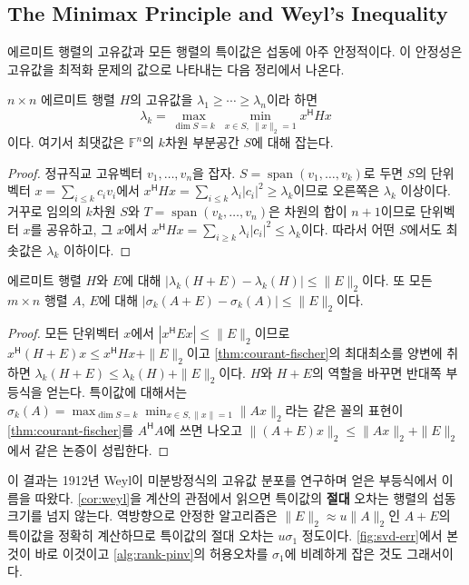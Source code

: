 \subsection{The Minimax Principle and Weyl's Inequality}

에르미트 행렬의 고유값과 모든 행렬의 특이값은 섭동에 아주 안정적이다. 이 안정성은 고유값을 최적화 문제의 값으로 나타내는 다음 정리에서 나온다.

\begin{theorem}
\label{thm:courant-fischer}
$n\times n$ 에르미트 행렬 $H$의 고유값을 $\lambda_1\ge\cdots\ge\lambda_n$이라 하면
\[
\lambda_k=\max_{\dim S=k}\ \min_{x\in S,\ \|x\|_2=1}x^{\mathsf H}Hx
\]
이다. 여기서 최댓값은 $\mathbb{F}^n$의 $k$차원 부분공간 $S$에 대해 잡는다.
\end{theorem}

\begin{proof}
정규직교 고유벡터 $v_1,\dots,v_n$을 잡자. $S=\operatorname{span}(v_1,\dots,v_k)$로 두면 $S$의 단위벡터 $x=\sum_{i\le k}c_iv_i$에서 $x^{\mathsf H}Hx=\sum_{i\le k}\lambda_i|c_i|^2\ge\lambda_k$이므로 오른쪽은 $\lambda_k$ 이상이다. 거꾸로 임의의 $k$차원 $S$와 $T=\operatorname{span}(v_k,\dots,v_n)$은 차원의 합이 $n+1$이므로 단위벡터 $x$를 공유하고, 그 $x$에서 $x^{\mathsf H}Hx=\sum_{i\ge k}\lambda_i|c_i|^2\le\lambda_k$이다. 따라서 어떤 $S$에서도 최솟값은 $\lambda_k$ 이하이다.
\end{proof}

\begin{corollary}[Weyl]
\label{cor:weyl}
에르미트 행렬 $H$와 $E$에 대해 $|\lambda_k(H+E)-\lambda_k(H)|\le\|E\|_2$이다. 또 모든 $m\times n$ 행렬 $A$, $E$에 대해 $|\sigma_k(A+E)-\sigma_k(A)|\le\|E\|_2$이다.
\end{corollary}

\begin{proof}
모든 단위벡터 $x$에서 $|x^{\mathsf H}Ex|\le\|E\|_2$이므로 $x^{\mathsf H}(H+E)x\le x^{\mathsf H}Hx+\|E\|_2$이고 \cref{thm:courant-fischer}의 최대최소를 양변에 취하면 $\lambda_k(H+E)\le\lambda_k(H)+\|E\|_2$이다. $H$와 $H+E$의 역할을 바꾸면 반대쪽 부등식을 얻는다. 특이값에 대해서는 $\sigma_k(A)=\max_{\dim S=k}\min_{x\in S,\|x\|=1}\|Ax\|_2$라는 같은 꼴의 표현이 \cref{thm:courant-fischer}를 $A^{\mathsf H}A$에 쓰면 나오고 $\|(A+E)x\|_2\le\|Ax\|_2+\|E\|_2$에서 같은 논증이 성립한다.
\end{proof}

이 결과는 1912년 Weyl이 미분방정식의 고유값 분포를 연구하며 얻은 부등식에서 이름을 따왔다\cite{weyl1912}. \cref{cor:weyl}을 계산의 관점에서 읽으면 특이값의 \textbf{절대} 오차는 행렬의 섭동 크기를 넘지 않는다. 역방향으로 안정한 알고리즘은 $\|E\|_2\approx u\|A\|_2$인 $A+E$의 특이값을 정확히 계산하므로 특이값의 절대 오차는 $u\sigma_1$ 정도이다. \cref{fig:svd-err}에서 본 것이 바로 이것이고 \cref{alg:rank-pinv}의 허용오차를 $\sigma_1$에 비례하게 잡은 것도 그래서이다.

